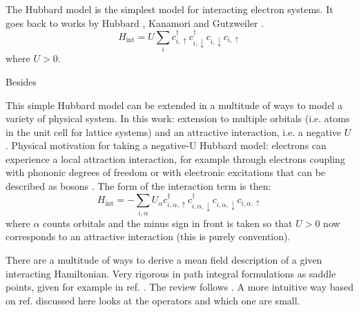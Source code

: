 \documentclass[../notes.tex]{subfiles}
\begin{document}
The Hubbard model is the simplest model for interacting electron systems.
It goes back to works by Hubbard \cite{hubbardElectronCorrelationsNarrow1963}, Kanamori \cite{kanamoriElectronCorrelationFerromagnetism1963} and Gutzweiler \cite{gutzwillerEffectCorrelationFerromagnetism1963}.
\begin{equation}
	H_{\mathrm{int}} = U \sum_{i} c_{i, \uparrow}^{\dagger} c_{i, \downarrow}^{\dagger} c_{i, \downarrow} c_{i, \uparrow}
\end{equation}
where \(U > 0\).

Besides 

\cite{qinHubbardModelComputational2022}


This simple Hubbard model can be extended in a multitude of ways to model a variety of physical system.
In this work: extension to multiple orbitals (i.e. atoms in the unit cell for lattice systems) and an attractive interaction, i.e. a negative \(U\).
Physical motivation for taking a negative-U Hubbard model: electrons can experience a local attraction interaction, for example through electrons coupling with phononic degrees of freedom or with electronic excitations that can be described as bosons \cite{micnasSuperconductivityNarrowbandSystems1990}.
The form of the interaction term is then: 
\begin{equation}
	H_{\mathrm{int}} = -\sum_{i, \alpha} U_{\alpha} c_{i, \alpha, \uparrow}^{\dagger} c_{i, \alpha, \downarrow}^{\dagger} c_{i, \alpha, \downarrow} c_{i, \alpha, \uparrow}
	\label{eq:Hubbard interaction multiband}
\end{equation}
where \(\alpha\) counts orbitals and the minus sign in front is taken so that \(U > 0\) now corresponds to an attractive interaction (this is purely convention).

There are a multitude of ways to derive a mean field description of a given interacting Hamiltonian.
Very rigorous in path integral formulations as saddle points, given for example in ref. \cite{colemanIntroductionManyBodyPhysics2015}.
The review follows \cite{huhtinenSuperconductivityNormalState2023}.
A more intuitive way based on ref. \cite{bruusManyBodyQuantumTheory2004} discussed here looks at the operators and which one are small. 
\end{document}
